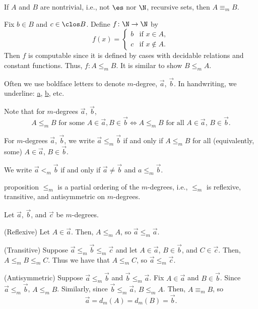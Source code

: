\documentclass[class=article, crop=false]{standalone}
\begin{document}
\begin{ex}
  If $A$ and $B$ are nontrivial, i.e., not $\es$ nor $\N$, recursive sets, then $A \equiv_m B$.

  \begin{pf}
    Fix $b \in B$ and $c \in \clos B$. Define $f\colon \N \to \N$ by
      \[
        f(x) =
          \begin{cases}
            b & \text{if } x\in A, \\
            c & \text{if } x \nin A.
          \end{cases}
      \]
    Then $f$ is computable since it is defined by cases with decidable relations and constant functions. Thus, $f\colon A \leq_m B$. It is similar to show $B \leq_m A$.
  \end{pf}
\end{ex}

\begin{nota}
  Often we use boldface letters to denote $m$-degree, $\vec a$, $\vec b$. In handwriting, we underline: \underline a, \underline b, etc.
\end{nota}

Note that for $m$-degrees $\vec a$, $\vec b$,
  \[
    A \leq_m B \text{ for some } A \in \vec a, B \in \vec b \iff A\leq_m B \text{ for all } A \in \vec a, \, B \in \vec b.
  \]

\begin{defn}
  For $m$-degrees $\vec a$, $\vec b$, we write $\vec a \leq_m \vec b$ if and only if $A \leq_m B$ for all (equivalently, some) $A \in \vec a$, $B \in \vec b$.

  We write $\vec a <_m \vec b$ if and only if $\vec a \neq \vec b$ and $a \leq_m \vec b$.
\end{defn}

\begin{result}{proposition}
  $\leq_m$ is a partial ordering of the $m$-degrees, i.e., $\leq_m$ is reflexive, transitive, and antisymmetric on $m$-degrees.
\end{result}
\begin{pf}
  Let $\vec a$, $\vec b$, and $\vec c$ be $m$-degrees.

  (Reflexive) Let $A \in \vec a$. Then, $A \leq_m A$, so $\vec a \leq_m \vec a$.

  (Transitive) Suppose $\vec a \leq_m \vec b \leq_m \vec c$ and let $A \in \vec a$, $B \in \vec b$, and $C \in \vec c$. Then, $A \leq_m B \leq_m C$. Thus we have that $A \leq_m C$, so $\vec a \leq_m \vec c$.

  (Antisymmetric) Suppose $\vec a \leq_m \vec b$ and $\vec b \leq_m \vec a$. Fix $A \in \vec a$ and $B \in \vec b$. Since $\vec a \leq_m \vec b$, $A \leq_m B$. Similarly, since $\vec b \leq_m \vec a$, $B \leq_m A$. Then, $A \equiv_m B$, so
    \[
      \vec a = d_m(A) = d_m(B) = \vec b.
    \]
\end{pf}
\end{document}
